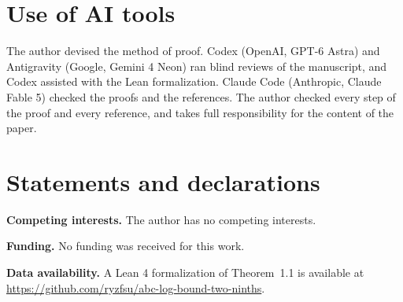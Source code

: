 \section*{Use of AI tools}

The author devised the method of proof. Codex (OpenAI, GPT-6 Astra) and
Antigravity (Google, Gemini 4 Neon) ran blind reviews of the manuscript,
and Codex assisted with the Lean formalization. Claude Code (Anthropic,
Claude Fable 5) checked the proofs and the references. The author checked
every step of the proof and every reference, and takes full responsibility
for the content of the paper.

\section*{Statements and declarations}

\noindent\textbf{Competing interests.} The author has no competing
interests.

\noindent\textbf{Funding.} No funding was received for this work.

\noindent\textbf{Data availability.} A Lean 4 formalization of
Theorem~1.1 is available at \url{https://github.com/ryzfsu/abc-log-bound-two-ninths}.
